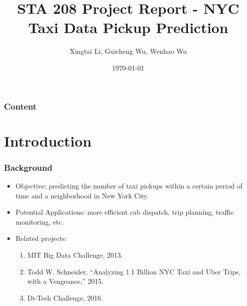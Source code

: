\documentclass{beamer}
\title[NYC-Taxi]{STA 208 Project Report - NYC Taxi Data Pickup Prediction} %
\author{Xingtai Li, Guicheng Wu, Wenhao Wu} %
\institute[UC Davis]{ %
  University of California, Davis \\ %
  \medskip
  \textit{gchwu, xtali, wnhwu@ucdavis.edu} %
}
\date{\today} %
\begin{document}
\begin{frame}
  \titlepage %
\end{frame}

\begin{frame}
  \frametitle{Content} %
  \tableofcontents %
\end{frame}

\section[Introduction]{Introduction}
\begin{frame}
  \frametitle{Background}
  \begin{itemize}
    \item Objective: predicting the number of taxi pickups within a certain period of time
    and a neighborhood in New York City.
    \item Potential Applications: more efficient cab dispatch, trip planning,
    traffic monitoring, etc.
    \item Related projects:
    \begin{enumerate}
      \item MIT Big Data Challenge, 2013.
      \item Todd W. Schneider, ``Analyzing 1.1 Billion NYC Taxi and Uber
      Trips, with a Vengeance,'' 2015.
      \item Di-Tech Challenge, 2016.
    \end{enumerate}
  \end{itemize}
\end{frame}
\end{document}
